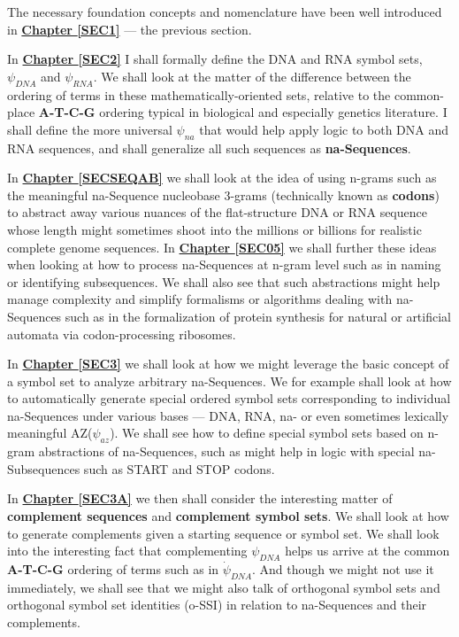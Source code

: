 \documentclass[a4paper, 18pt]{book} %
\begin{document}
The necessary foundation concepts and nomenclature have been well introduced in \textbf{\hyperref[SEC1]{Chapter \ref{SEC1}}} --- the previous section.

In \textbf{\hyperref[SEC2]{Chapter \ref{SEC2}}} I shall formally define the DNA and RNA symbol sets, $\psi_{DNA}$ and $\psi_{RNA}$. We shall look at the matter of the difference between the ordering of terms in these mathematically-oriented sets, relative to the common-place \textbf{A-T-C-G} ordering typical in biological and especially genetics literature. I shall define the more universal $\psi_{na}$ that would help apply logic to both DNA and RNA sequences, and shall generalize all such sequences as \textbf{na-Sequences}.

In \textbf{\hyperref[SECSEQAB]{Chapter \ref{SECSEQAB}}} we shall look at the idea of using n-grams such as the meaningful na-Sequence nucleobase 3-grams (technically known as \textbf{codons}) to abstract away various nuances of the flat-structure DNA or RNA sequence whose length might sometimes shoot into the millions or billions for realistic complete genome sequences. In \textbf{\hyperref[SEC05]{Chapter \ref{SEC05}}} we shall further these ideas when looking at how to process na-Sequences at n-gram level such as in naming or identifying subsequences. We shall also see that such abstractions might help manage complexity and simplify formalisms or algorithms dealing with na-Sequences such as in the formalization of protein synthesis for natural or artificial automata via codon-processing ribosomes.


In \textbf{\hyperref[SEC3]{Chapter \ref{SEC3}}} we shall look at how we might leverage the basic concept of a symbol set to analyze arbitrary na-Sequences. We for example shall look at how to automatically generate special ordered symbol sets corresponding to individual na-Sequences under various bases --- DNA, RNA, na- or even sometimes lexically meaningful AZ($\psi_{az}$). We shall see how to define special symbol sets based on n-gram abstractions of na-Sequences, such as might help in logic with special na-Subsequences such as START and STOP codons.


In \textbf{\hyperref[SEC3A]{Chapter \ref{SEC3A}}} we then shall consider the interesting matter of \textbf{complement sequences} and \textbf{complement symbol sets}. We shall look at how to generate complements given a starting sequence or symbol set. We shall look into the interesting fact that complementing $\psi_{DNA}$ helps us arrive at the common \textbf{A-T-C-G} ordering of terms such as in $\dot{\psi}_{DNA}$. And though we might not use it immediately, we shall see that we might also talk of orthogonal symbol sets and orthogonal symbol set identities (o-SSI\cite{ossipaper}) in relation to na-Sequences and their complements.
\end{document}
